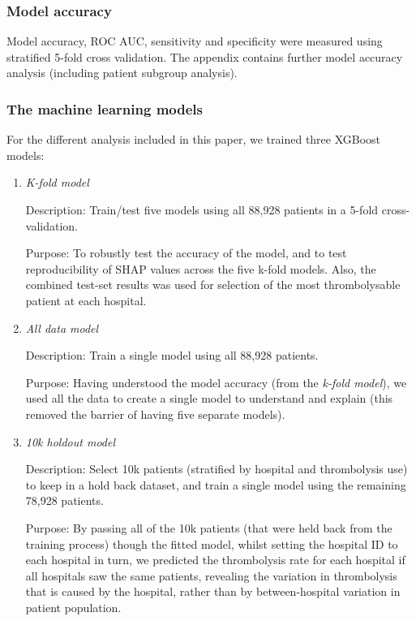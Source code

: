 \subsubsection{Model accuracy}
Model accuracy, ROC AUC, sensitivity and specificity were measured using stratified 5-fold cross validation. The appendix contains further model accuracy analysis (including patient subgroup analysis).

\subsubsection{The machine learning models}

For the different analysis included in this paper, we trained three XGBoost models:
\begin{enumerate}
    \item {\emph{K-fold model}}
    
    Description: Train/test five models using all 88,928 patients in a 5-fold cross-validation.
    
    Purpose: To robustly test the accuracy of the model, and to test reproducibility of SHAP values across the five k-fold models. Also, the combined test-set results was used for selection of the most thrombolysable patient at each hospital.
    \item {\emph{All data model}}
    
    Description: Train a single model using all 88,928 patients.
    
    Purpose: Having understood the model accuracy (from the \emph{k-fold model}), we used all the data to create a single model to understand and explain (this removed the barrier of having five separate models).
    \item {\emph{10k holdout model}}

    Description: Select 10k patients (stratified by hospital and thrombolysis use) to keep in a hold back dataset, and train a single model using the remaining 78,928 patients. 
    
    Purpose: By passing all of the 10k patients (that were held back from the training process) though the fitted model, whilst setting the hospital ID to each hospital in turn, we predicted the thrombolysis rate for each hospital if all hospitals saw the same patients, revealing the variation in thrombolysis that is caused by the hospital, rather than by between-hospital variation in patient population.
\end{enumerate}

